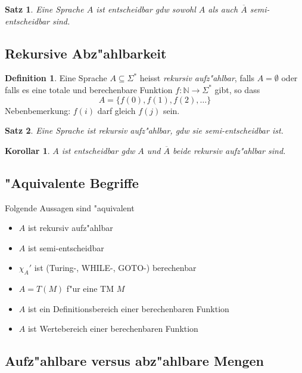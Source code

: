 \documentclass[german, 10pt, a4paper, twocolumn]{scrartcl}
\newtheorem{satz}{Satz}[section]
\newtheorem{korollar}{Korollar}[section]
\theoremstyle{definition}
\newtheorem*{definition}{Definition}
\theoremstyle{example}
\begin{document}
\begin{satz}
	Eine Sprache $A$ ist entscheidbar gdw sowohl $A$ als auch $\overline{A}$ semi-entscheidbar sind.
\end{satz}

\subsection{Rekursive Abz"ahlbarkeit}

\begin{definition}
	Eine Sprache $A \subseteq \Sigma^*$ heisst \textit{rekursiv aufz"ahlbar}, falls $A = \emptyset$ oder falls es eine totale und berechenbare Funktion $f: \mathbb{N} \to \Sigma^*$ gibt, so dass 
	\begin{displaymath}
		A = \{ f(0), f(1), f(2), \ldots \}
	\end{displaymath}
	Nebenbemerkung: $f(i)$ darf gleich $f(j)$ sein.
\end{definition}

\begin{satz}
	Eine Sprache ist rekursiv aufz"ahlbar, gdw sie semi-entscheidbar ist.
\end{satz}

\begin{korollar}
	$A$ ist entscheidbar gdw $A$ und $\overline{A}$ beide rekursiv aufz"ahlbar sind.
\end{korollar}

\subsection{"Aquivalente Begriffe}

Folgende Aussagen sind "aquivalent

\begin{itemize}
	\item $A$ ist rekursiv aufz"ahlbar
	\item $A$ ist semi-entscheidbar
	\item $\chi_A '$ ist (Turing-, WHILE-, GOTO-) berechenbar
	\item $A=T(M)$ f"ur eine TM $M$
	\item $A$ ist ein Definitionsbereich einer berechenbaren Funktion
	\item $A$ ist Wertebereich einer berechenbaren Funktion
\end{itemize}

\subsection{Aufz"ahlbare versus abz"ahlbare Mengen}
\end{document}
